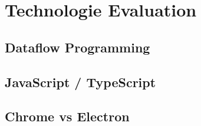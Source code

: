 \chapter{Technologie Evaluation}

\section{Dataflow Programming}

\section{JavaScript / TypeScript}

\section{Chrome vs Electron}